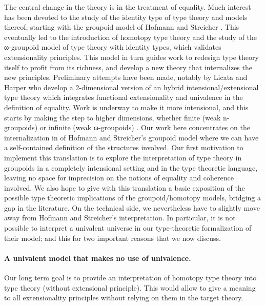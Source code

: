 The central change in the theory is in the treatment of equality.  Much
interest has been devoted to the study of the identity type of type
theory and models thereof, starting with the groupoid model of Hofmann
and Streicher \cite{groupoid-interp}. This eventually led to the
introduction of homotopy type theory and the study of the ω-groupoid
model of type theory with identity types, which validates extensionality
principles.
This model in turn
guides work to redesign type theory itself to profit from its
richness, and develop a new theory that internalizes the new
principles. Preliminary attempts have been made, notably by Licata and
Harper \cite{DBLP:conf/popl/LicataH12} who develop a 2-dimensional
version of an hybrid intensional/extensional type theory which
integrates functional extensionality and univalence in the definition
of equality. Work is underway to make it more intensional, and this
starts by making the step to higher dimensions, whether finite (weak
n-groupoids) or infinite (weak ω-groupoids)
\cite{DBLP:conf/csl/AltenkirchR12}. %
%
Our work here concentrates on the internalization in \Coq of Hofmann and
Streicher's groupoid model where we can have a self-contained definition
of the structures involved.
%
Our first motivation to implement this translation is to explore the
interpretation of type theory in groupoids in a completely
intensional setting and in the type theoretic language, leaving no space
for imprecision on the notions of equality and coherence involved.  We
also hope to give with this translation a basic exposition of the
possible type theoretic implications of the groupoid/homotopy models,
bridging a gap in the literature. 
%
On the technical side, we nevertheless have to slightly move away from
Hofmann and Streicher's interpretation.  In particular, it is not
possible to interpret a univalent universe in our type-theoretic
formalization of their model; and this for two important reasons that we
now discuss.


\paragraph{\bf A univalent model that makes no use of univalence.}


Our long term goal is to provide an interpretation of homotopy type
theory into type theory (without extensional principle).
%
This would allow to give a meaning to all extensionality
principles without relying on them in the target theory.

